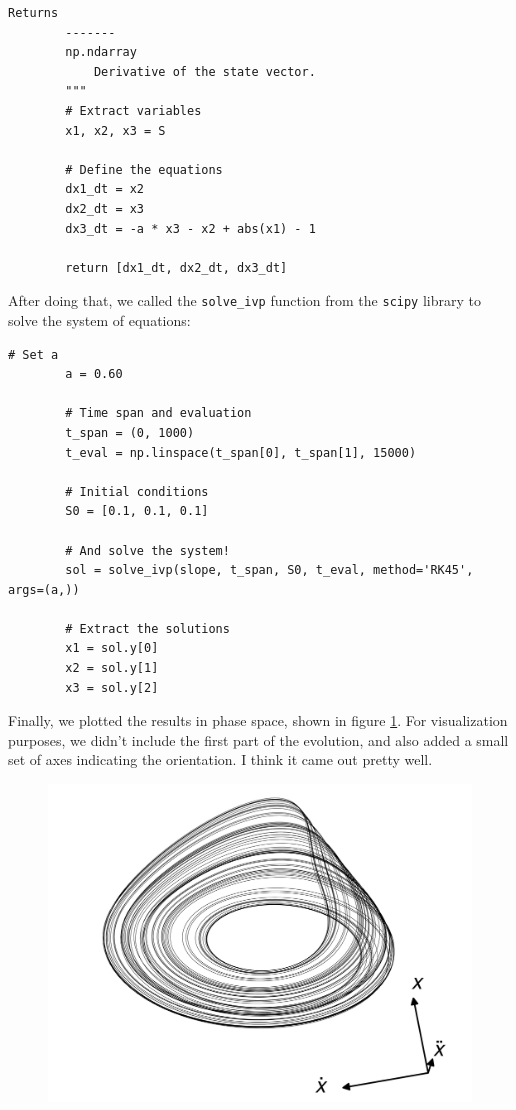 \begin{enumerate}[(a)]
\begin{lstlisting}[style=pythonstyle]
        Returns
        -------
        np.ndarray
            Derivative of the state vector.
        """
        # Extract variables
        x1, x2, x3 = S

        # Define the equations
        dx1_dt = x2
        dx2_dt = x3
        dx3_dt = -a * x3 - x2 + abs(x1) - 1

        return [dx1_dt, dx2_dt, dx3_dt]
    \end{lstlisting}

    After doing that, we called the \texttt{solve\_ivp} function from the \texttt{scipy}
    library to solve the system of equations:

    \begin{lstlisting}[style=pythonstyle]
        # Set a
        a = 0.60

        # Time span and evaluation
        t_span = (0, 1000)
        t_eval = np.linspace(t_span[0], t_span[1], 15000)

        # Initial conditions
        S0 = [0.1, 0.1, 0.1]

        # And solve the system!
        sol = solve_ivp(slope, t_span, S0, t_eval, method='RK45', args=(a,))

        # Extract the solutions
        x1 = sol.y[0]
        x2 = sol.y[1]
        x3 = sol.y[2]
    \end{lstlisting}

    Finally, we plotted the results in phase space, shown in figure \ref{fig:6b}. For
    visualization purposes, we didn't include the first part of the evolution, and also added 
    a small set of axes indicating the orientation. I think it came out pretty well.
    \begin{figure}[!ht]
        \centering
        \includegraphics[scale=0.10]{images/6b.png}
        \label{fig:6b}
    \end{figure}


\end{enumerate}
